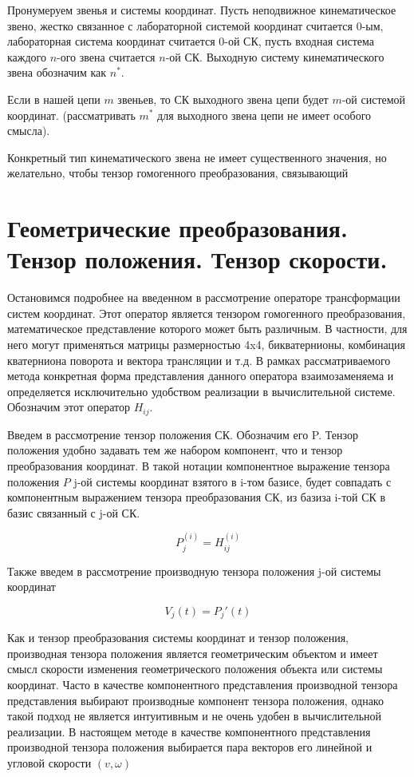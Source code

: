 \documentclass[12pt,a4paper,titlepage]{article}
\begin{document}
Пронумеруем звенья и системы координат. Пусть неподвижное кинематическое звено, жестко связанное с лабораторной системой координат считается 0-ым, лабораторная система координат считается 0-ой СК, пусть входная система каждого $n$-ого звена считается $n$-ой СК. Выходную систему кинематического звена обозначим как $n^*$. 

Если в нашей цепи $m$ звеньев, то СК выходного звена цепи будет $m$-ой системой координат. (рассматривать $m^*$ для выходного звена цепи не имеет особого смысла).

Конкретный тип кинематического звена не имеет существенного значения, но желательно, чтобы тензор гомогенного преобразования, связывающий

\newpage
\section{Геометрические преобразования. Тензор положения. Тензор скорости.}\label{geom}

Остановимся подробнее на введенном в рассмотрение операторе трансформации систем координат. Этот оператор является тензором гомогенного преобразования, математическое представление которого может быть различным. В частности, для него могут применяться матрицы размерностью 4x4, бикватернионы, комбинация кватерниона поворота и вектора трансляции и т.д. В рамках рассматриваемого метода конкретная форма представления данного оператора взаимозаменяема и определяется исключительно удобством реализации в вычислительной системе. Обозначим этот оператор $H_{ij}$.

Введем в рассмотрение тензор положения СК. Обозначим его P. Тензор положения удобно задавать тем же набором компонент, что и тензор преобразования координат. В такой нотации компонентное выражение тензора положения $P$ j-ой системы координат взятого в i-том базисе, будет совпадать с компонентным выражением тензора преобразования СК, из базиза i-той СК в базис связанный с j-ой СК. 

\begin{equation}
P_j^{(i)} = H_{ij}^{(i)}
\end{equation}

Также введем в рассмотрение производную тензора положения j-ой системы координат

\begin{equation}\label{speed_eq} 
V_j(t) = P_j'(t) 
\end{equation}

Как и тензор преобразования системы координат и тензор положения, производная тензора положения является геометрическим объектом и имеет смысл скорости изменения геометрического положения объекта или системы координат. Часто в качестве компонентного представления производной тензора представления выбирают производные компонент тензора положения, однако такой подход не является интуитивным и не очень удобен в вычислительной реализации. В настоящем методе в качестве компонентного представления производной тензора положения выбирается пара векторов его линейной и угловой скорости $(v,\omega)$
\end{document}
